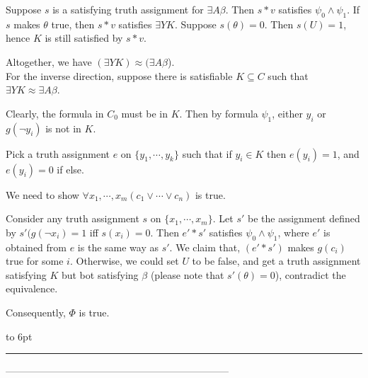 \documentclass[12pt]{article}
\newenvironment{proof}{\parindent=0pt{\bf Proof: }}{
   \hspace*{\fill}\hbox to 6pt{\leaders\hrule width 6pt height 6pt\hfill}\par}
\begin{document}
\begin{proof}
Suppose $s$ is a satisfying truth assignment for $\exists A \beta$. Then $s*v$ satisfies $\psi_0\wedge \psi_1$. If $s$ makes $\theta$ true, then $s*v$ satisfies $\exists Y K$. Suppose $s(\theta)=0$. Then $s(U)=1$, hence $K$ is still satisfied by $s*v$.

Altogether, we have $(\exists Y K) \approx (\exists A \beta$).\\


For the inverse direction, suppose there is satisfiable $K\subseteq C$ such that $\exists Y K \approx \exists A \beta$.


Clearly, the formula in $C_0$ must be in $K$. Then by formula $\psi_1$, either $y_i$ or  $g(\neg y_i)$ is not in $K$.

Pick a truth assignment $e$ on $\{y_1,\cdots, y_k\}$ such that if $y_i\in K$ then $e(y_i)=1$, and $e(y_i)=0$  if else.

We need to show $\forall x_1,\cdots,x_m(c_1\vee\cdots\vee c_n)$ is true.

Consider any truth assignment $s$ on $\{x_1,\cdots, x_m\}$. Let $s'$ be the assignment defined by $s'(g(\neg x_i)=1$ iff $s(x_i)=0$. Then $e'*s'$ satisfies $\psi_0\wedge\psi_1$, where $e'$ is obtained from $e$ is the same way as $s'$.
We claim that, $(e'*s')$ makes $g(c_i)$ true for some $i$. Otherwise, we could set $U$ to be false,  and get a truth assignment satisfying $K$ but bot satisfying $\beta$ (please note that $s'(\theta)=0$), contradict the equivalence.

Consequently, $\Phi$ is true.
 \end{proof}


--------------------------------------------------------------------
\end{document}

